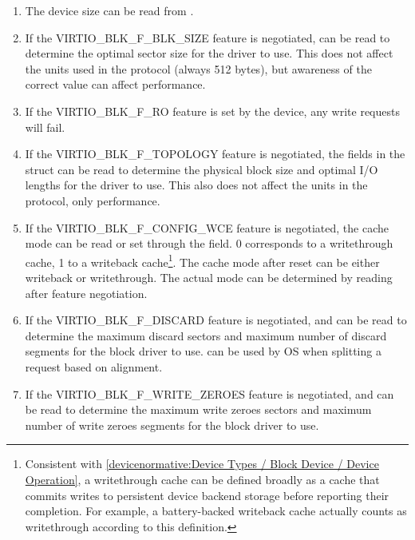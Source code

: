\begin{enumerate}
\item The device size can be read from .

\item If the VIRTIO_BLK_F_BLK_SIZE feature is negotiated,
   can be read to determine the optimal sector size
  for the driver to use. This does not affect the units used in
  the protocol (always 512 bytes), but awareness of the correct
  value can affect performance.

\item If the VIRTIO_BLK_F_RO feature is set by the device, any write
  requests will fail.

\item If the VIRTIO_BLK_F_TOPOLOGY feature is negotiated, the fields in the
   struct can be read to determine the physical block size and optimal
  I/O lengths for the driver to use. This also does not affect the units
  in the protocol, only performance.

\item If the VIRTIO_BLK_F_CONFIG_WCE feature is negotiated, the cache
  mode can be read or set through the  field.  0 corresponds
  to a writethrough cache, 1 to a writeback cache\footnote{Consistent with
    \ref{devicenormative:Device Types / Block Device / Device Operation},
    a writethrough cache can be defined broadly as a cache that commits
    writes to persistent device backend storage before reporting their
    completion. For example, a battery-backed writeback cache actually
    counts as writethrough according to this definition.}.  The cache mode
  after reset can be either writeback or writethrough.  The actual
  mode can be determined by reading  after feature
  negotiation.

\item If the VIRTIO_BLK_F_DISCARD feature is negotiated,
     and  can be read
    to determine the maximum discard sectors and maximum number of discard
    segments for the block driver to use. 
    can be used by OS when splitting a request based on alignment.

\item If the VIRTIO_BLK_F_WRITE_ZEROES feature is negotiated,
     and  can
    be read to determine the maximum write zeroes sectors and maximum
    number of write zeroes segments for the block driver to use.


\end{enumerate}
